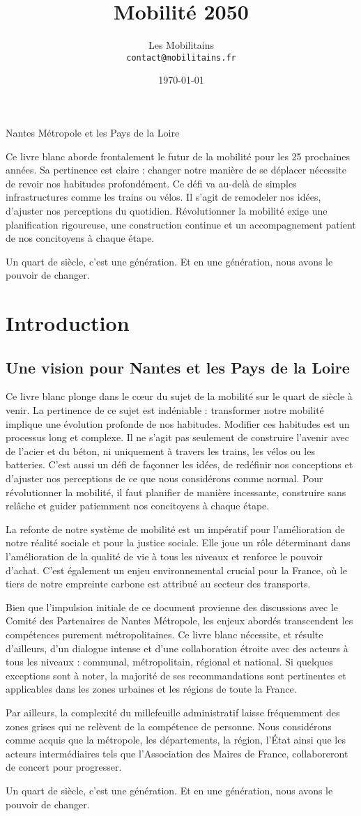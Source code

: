 \documentclass[11 pt]{report}
\title{Mobilité 2050}
\author{Les Mobilitains\\
\texttt{\footnotesize{contact@mobilitains.fr}}}
\date{\today}
\makeatletter
\newcommand{\theabstract}{%
    Ce livre blanc aborde frontalement le futur de la mobilité
    pour les 25 prochaines années. Sa pertinence est claire : changer
    notre manière de se déplacer nécessite de revoir nos habitudes
    profondément. Ce défi va au-delà de simples infrastructures comme
    les trains ou vélos. Il s'agit de remodeler nos idées, d'ajuster nos
    perceptions du quotidien. Révolutionner la mobilité exige une
    planification rigoureuse, une construction continue et un
    accompagnement patient de nos concitoyens à chaque étape.

    \vspace{8pt}
    Un quart de siècle, c'est une génération. Et en une
    génération, nous avons le pouvoir de changer.
}
\renewcommand{\maketitle}{
  \begin{titlepage}
    \begin{center}
      \vspace*{1cm}
      {\Huge\textbf{\@title}} %

      \vspace{1mm}
      {\Large{Nantes Métropole et les Pays de la Loire}} %

      \vspace{15mm}
      {\Large\textbf{\@author}} %

      \vspace{8mm}
      {\large\@date} %

      \vspace{20mm}
      \parbox{.8\textwidth}{\theabstract} %
    \end{center}
  \end{titlepage}
}
\makeatother
\begin{document}
\maketitle

\tableofcontents

\chapter{Introduction}

\section*{Une vision pour Nantes et les Pays de la Loire}

Ce livre blanc plonge dans le cœur du sujet de la mobilité sur le
quart de siècle à venir. La pertinence de ce sujet est indéniable :
transformer notre mobilité implique une évolution profonde de nos
habitudes. Modifier ces habitudes est un processus long et
complexe. Il ne s'agit pas seulement de construire l'avenir avec de
l'acier et du béton, ni uniquement à travers les trains, les vélos ou
les batteries. C'est aussi un défi de façonner les idées, de redéfinir
nos conceptions et d'ajuster nos perceptions de ce que nous
considérons comme normal. Pour révolutionner la mobilité, il faut
planifier de manière incessante, construire sans relâche et guider
patiemment nos concitoyens à chaque étape.

La refonte de notre système de mobilité est un impératif pour
l'amélioration de notre réalité sociale et pour la justice
sociale. Elle joue un rôle déterminant dans l'amélioration de la
qualité de vie à tous les niveaux et renforce le pouvoir
d'achat. C'est également un enjeu environnemental crucial pour la
France, où le tiers de notre empreinte carbone est attribué au secteur
des transports.

Bien que l'impulsion initiale de ce document provienne des discussions
avec le Comité des Partenaires de Nantes Métropole, les enjeux abordés
transcendent les compétences purement métropolitaines. Ce livre blanc
nécessite, et résulte d'ailleurs, d'un dialogue intense et d'une
collaboration étroite avec des acteurs à tous les niveaux : communal,
métropolitain, régional et national. Si quelques exceptions sont à
noter, la majorité de ses recommandations sont pertinentes et
applicables dans les zones urbaines et les régions de toute la France.

Par ailleurs, la complexité du millefeuille administratif laisse
fréquemment des zones grises qui ne relèvent de la compétence de
personne. Nous considérons comme acquis que la métropole, les
départements, la région, l'État ainsi que les acteurs intermédiaires
tels que l'Association des Maires de France, collaboreront de concert
pour progresser.

Un quart de siècle, c'est une génération. Et en une génération, nous
avons le pouvoir de changer.








\end{document}
